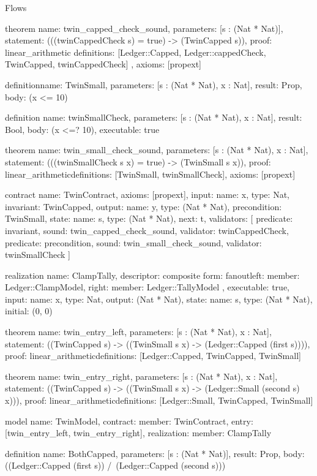 \begin{lexlean}{Flows}
\begin{semanticmodule}
theorem{
  name: twin_capped_check_sound,
  parameters: [s : (Nat * Nat)],
  statement: (((twinCappedCheck s) = true) -> (TwinCapped s)),
  proof: linear_arithmetic{
    definitions: [Ledger::Capped, Ledger::cappedCheck, TwinCapped, twinCappedCheck]
  },
  axioms: [propext]
}

definition{name: TwinSmall, parameters: [s : (Nat * Nat), x : Nat], result: Prop, body: (x <= 10)}

definition{
  name: twinSmallCheck,
  parameters: [s : (Nat * Nat), x : Nat],
  result: Bool,
  body: (x <=? 10),
  executable: true
}

theorem{
  name: twin_small_check_sound,
  parameters: [s : (Nat * Nat), x : Nat],
  statement: (((twinSmallCheck s x) = true) -> (TwinSmall s x)),
  proof: linear_arithmetic{definitions: [TwinSmall, twinSmallCheck]},
  axioms: [propext]
}

contract{
  name: TwinContract,
  axioms: [propext],
  input: {name: x, type: Nat},
  invariant: TwinCapped,
  output: {name: y, type: (Nat * Nat)},
  precondition: TwinSmall,
  state: {name: s, type: (Nat * Nat), next: t},
  validators: [
    {predicate: invariant, sound: twin_capped_check_sound, validator: twinCappedCheck},
    {predicate: precondition, sound: twin_small_check_sound, validator: twinSmallCheck}
  ]
}

realization{
  name: ClampTally,
  descriptor: composite{
    form: fanout{left: {member: Ledger::ClampModel}, right: {member: Ledger::TallyModel}}
  },
  executable: true,
  input: {name: x, type: Nat},
  output: (Nat * Nat),
  state: {name: s, type: (Nat * Nat), initial: (0, 0)}
}

theorem{
  name: twin_entry_left,
  parameters: [s : (Nat * Nat), x : Nat],
  statement: ((TwinCapped s) -> ((TwinSmall s x) -> (Ledger::Capped (first s)))),
  proof: linear_arithmetic{definitions: [Ledger::Capped, TwinCapped, TwinSmall]}
}

theorem{
  name: twin_entry_right,
  parameters: [s : (Nat * Nat), x : Nat],
  statement: ((TwinCapped s) -> ((TwinSmall s x) -> (Ledger::Small (second s) x))),
  proof: linear_arithmetic{definitions: [Ledger::Small, TwinCapped, TwinSmall]}
}

model{
  name: TwinModel,
  contract: {member: TwinContract},
  entry: [twin_entry_left, twin_entry_right],
  realization: {member: ClampTally}
}

definition{
  name: BothCapped,
  parameters: [s : (Nat * Nat)],
  result: Prop,
  body: ((Ledger::Capped (first s)) /\ (Ledger::Capped (second s)))
}


\end{semanticmodule}
\end{lexlean}
